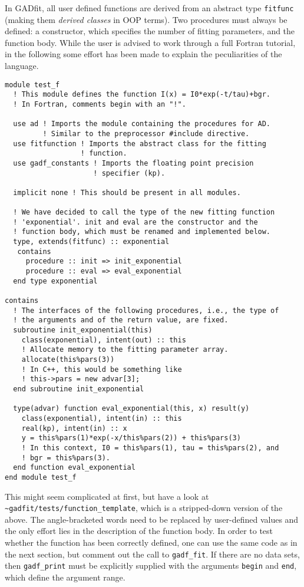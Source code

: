 \documentclass{article}
\begin{document}
In GADfit, all user defined functions are derived from an abstract type \texttt{fitfunc} (making them \textit{derived classes} in OOP terms). Two procedures must always be defined: a constructor, which specifies the number of fitting parameters, and the function body. While the user is advised to work through a full Fortran tutorial, in the following some effort has been made to explain the peculiarities of the language.
\begin{verbatim}
module test_f
  ! This module defines the function I(x) = I0*exp(-t/tau)+bgr.
  ! In Fortran, comments begin with an "!".

  use ad ! Imports the module containing the procedures for AD.
         ! Similar to the preprocessor #include directive.
  use fitfunction ! Imports the abstract class for the fitting
                  ! function.
  use gadf_constants ! Imports the floating point precision
                     ! specifier (kp).

  implicit none ! This should be present in all modules.

  ! We have decided to call the type of the new fitting function
  ! 'exponential'. init and eval are the constructor and the
  ! function body, which must be renamed and implemented below.
  type, extends(fitfunc) :: exponential
   contains
     procedure :: init => init_exponential
     procedure :: eval => eval_exponential
  end type exponential

contains
  ! The interfaces of the following procedures, i.e., the type of
  ! the arguments and of the return value, are fixed.
  subroutine init_exponential(this)
    class(exponential), intent(out) :: this
    ! Allocate memory to the fitting parameter array.
    allocate(this%pars(3))
    ! In C++, this would be something like
    ! this->pars = new advar[3];
  end subroutine init_exponential

  type(advar) function eval_exponential(this, x) result(y)
    class(exponential), intent(in) :: this
    real(kp), intent(in) :: x
    y = this%pars(1)*exp(-x/this%pars(2)) + this%pars(3)
    ! In this context, I0 = this%pars(1), tau = this%pars(2), and
    ! bgr = this%pars(3).
  end function eval_exponential
end module test_f
\end{verbatim}
This might seem complicated at first, but have a look at \\
\verb+~gadfit/tests/function_template+, which is a stripped-down version of the above. The angle-bracketed words need to be replaced by user-defined values and the only effort lies in the description of the function body. In order to test whether the function has been correctly defined, one can use the same code as in the next section, but comment out the call to \verb+gadf_fit+. If there are no data sets, then \verb+gadf_print+ must be explicitly supplied with the arguments \verb+begin+ and \verb+end+, which define the argument range.
\end{document}
